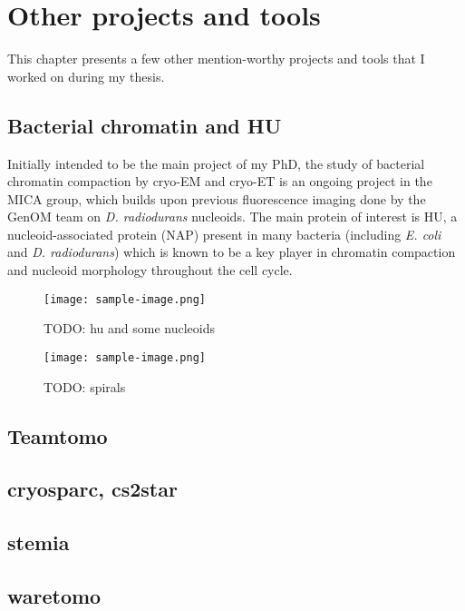\chapter{Other projects and tools}\label{other_projects}

This chapter presents a few other mention-worthy projects and tools that I worked on during my thesis.

\localtableofcontents

\section{Bacterial chromatin and HU}

Initially intended to be the main project of my PhD, the study of bacterial chromatin compaction by cryo-EM and cryo-ET is an ongoing project in the MICA group, which builds upon previous fluorescence imaging done by the GenOM team on \textit{D. radiodurans} nucleoids.
The main protein of interest is HU, a nucleoid-associated protein (NAP) present in many bacteria (including \textit{E. coli} and \textit{D. radiodurans}) which is known to be a key player in chromatin compaction and nucleoid morphology throughout the cell cycle.

\begin{figure}[ht]
    \centering
    \texttt{[image: sample-image.png]}
    \caption{TODO: hu and some nucleoids}
    \label{fig:hu}
\end{figure}

\begin{figure}[ht]
    \centering
    \texttt{[image: sample-image.png]}
    \caption{TODO: spirals}
    \label{fig:hu_spirals}
\end{figure}

\section{Teamtomo}

\section{cryosparc, cs2star}

\section{stemia}

\section{waretomo}

